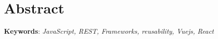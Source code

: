 
\chapter{Abstract}

\lipsum[1]

\noindent \textbf{Keywords}: \textit{JavaScript, REST, Frameworks, reusability, Vuejs, React}
